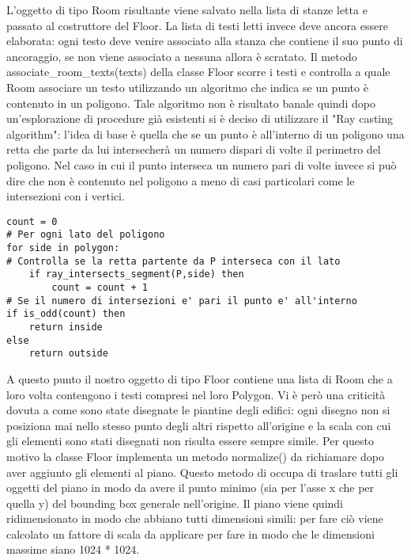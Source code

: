 \documentclass[12pt]{report}
\begin{document}
L'oggetto di tipo Room risultante viene salvato nella lista di stanze letta e passato al costruttore del Floor. La lista di testi letti invece deve ancora essere elaborata: ogni testo deve venire associato alla stanza che contiene il suo punto di ancoraggio, se non viene associato a nessuna allora è scratato.
Il metodo associate\_room\_texts(texts) della classe Floor scorre i testi e controlla a quale Room associare un testo utilizzando un algoritmo che indica se un punto è contenuto in un poligono. 
Tale algoritmo non è risultato banale quindi dopo un'esplorazione di procedure già esistenti si è deciso di utilizzare il "Ray casting algorithm": l'idea di base è quella che se un punto è all'interno di un poligono una retta che parte da lui intersecherà un numero dispari di volte il perimetro del poligono. Nel caso in cui il punto interseca un numero pari di volte invece si può dire che non è contenuto nel poligono a meno di casi particolari come le intersezioni con i vertici.

\begin{lstlisting}[label=codice,caption=Ray casting algorithm in pseudocodice, frame=single]
count = 0
# Per ogni lato del poligono
for side in polygon:
# Controlla se la retta partente da P interseca con il lato
    if ray_intersects_segment(P,side) then
        count = count + 1
# Se il numero di intersezioni e' pari il punto e' all'interno
if is_odd(count) then    
    return inside
else
    return outside
\end{lstlisting}

A questo punto il nostro oggetto di tipo Floor contiene una lista di Room che a loro volta contengono i testi compresi nel loro Polygon. 
Vi è però una criticità dovuta a come sono state disegnate le piantine degli edifici: ogni disegno non si posiziona mai nello stesso punto degli altri rispetto all'origine e la scala con cui gli elementi sono stati disegnati non risulta essere sempre simile. 
Per questo motivo la classe Floor implementa un metodo normalize() da richiamare dopo aver aggiunto gli elementi al piano. 
Questo metodo di occupa di traslare tutti gli oggetti del piano in modo da avere il punto minimo (sia per l'asse x che per quella y) del bounding box generale nell'origine. 
Il piano viene quindi ridimensionato in modo che abbiano tutti dimensioni simili: per fare ciò viene calcolato un fattore di scala da applicare per fare in modo che le dimensioni massime siano 1024 * 1024.
\end{document}
